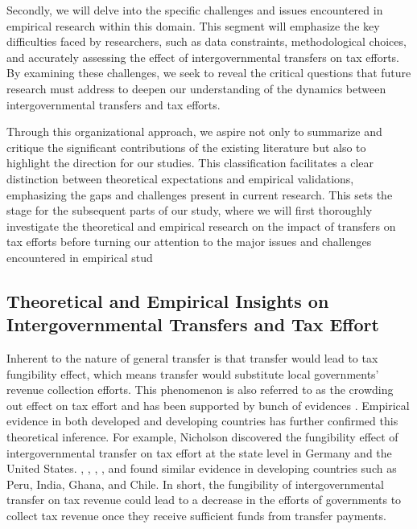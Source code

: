 Secondly, we will delve into the specific challenges and issues encountered in empirical research within this domain. This segment will emphasize the key difficulties faced by researchers, such as data constraints, methodological choices, and accurately assessing the effect of intergovernmental transfers on tax efforts. By examining these challenges, we seek to reveal the critical questions that future research must address to deepen our understanding of the dynamics between intergovernmental transfers and tax efforts.

Through this organizational approach, we aspire not only to summarize and critique the significant contributions of the existing literature but also to highlight the direction for our studies. This classification facilitates a clear distinction between theoretical expectations and empirical validations, emphasizing the gaps and challenges present in current research. This sets the stage for the subsequent parts of our study, where we will first thoroughly investigate the theoretical and empirical research on the impact of transfers on tax efforts before turning our attention to the major issues and challenges encountered in empirical stud

\subsection{Theoretical and Empirical Insights on Intergovernmental Transfers and Tax Effort}

Inherent to the nature of general transfer is that transfer would lead to tax fungibility effect, which means transfer would substitute local governments' revenue collection efforts. This phenomenon is also referred to as the crowding out effect on tax effort and has been supported by bunch of evidences \parencite{inman1988federal,peterson1997decentralization,litvack1998rethinking}. Empirical evidence in both developed and developing countries has further confirmed this theoretical inference. For example, Nicholson \cite{nicholson2008fiscal} discovered the fungibility effect of intergovernmental transfer on tax effort at the state level in Germany and the United States.  \textcite{2002A}, \textcite{aragon2005intergovernmental}, \textcite{panda2009central}, \textcite{mogues2012external}, and \textcite{bravo2013income} found similar evidence in developing countries such as Peru, India, Ghana, and Chile. In short, the fungibility of intergovernmental transfer on tax revenue could lead to a decrease in the efforts of governments to collect tax revenue once they receive sufficient funds from transfer payments.

